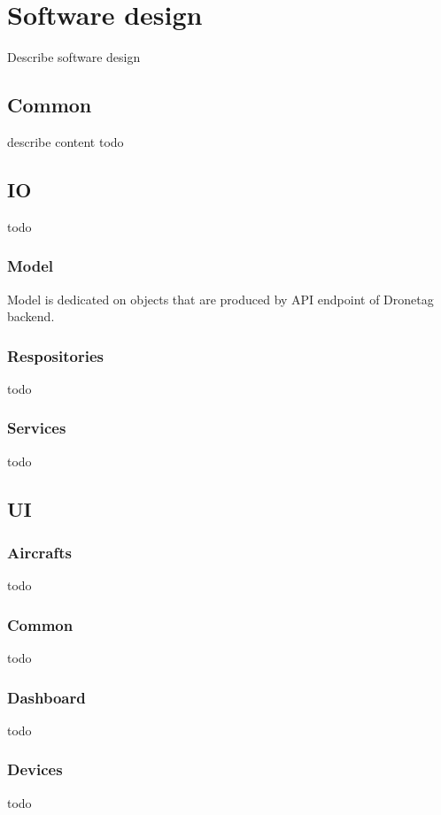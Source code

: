 \chapter{Software design}
Describe software design

\section{Common}
describe content
todo

\section{IO}
todo

\subsection{Model}
Model is dedicated on objects that are produced by API endpoint of Dronetag backend.

\subsection{Respositories}
todo

\subsection{Services}
todo

\section{UI}

\subsection{Aircrafts}
todo

\subsection{Common}
todo

\subsection{Dashboard}
todo

\subsection{Devices}
todo

